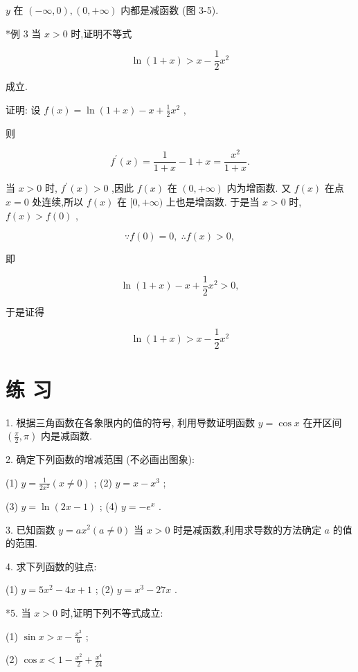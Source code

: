 \documentclass[lang=cn,newtx,10pt,scheme=chinese]{elegantbook}
\begin{document}
\(y\) 在 \(\left( {-\infty ,0}\right) ,\left( {0, + \infty }\right)\) 内都是减函数 (图 3-5).

*例 3 当 \(x > 0\) 时,证明不等式

\[
\ln \left( {1 + x}\right) > x - \frac{1}{2}{x}^{2}
\]

成立.

证明: 设 \(f\left( x\right) = \ln \left( {1 + x}\right) - x + \frac{1}{2}{x}^{2}\) ,

则

\[
{f}^{\prime }\left( x\right) = \frac{1}{1 + x} - 1 + x = \frac{{x}^{2}}{1 + x}.
\]

当 \(x > 0\) 时, \({f}^{\prime }\left( x\right) > 0\) ,因此 \(f\left( x\right)\) 在 \(\left( {0, + \infty }\right)\) 内为增函数. 又 \(f\left( x\right)\) 在点 \(x = 0\) 处连续,所以 \(f\left( x\right)\) 在 \(\lbrack 0, + \infty )\) 上也是增函数. 于是当 \(x > 0\) 时, \(f\left( x\right) > f\left( 0\right)\) ,

\[
\because f\left( 0\right) = 0,\;\therefore f\left( x\right) > 0,
\]

即

\[
\ln \left( {1 + x}\right) - x + \frac{1}{2}{x}^{2} > 0,
\]

于是证得

\[
\ln \left( {1 + x}\right) > x - \frac{1}{2}{x}^{2}
\]

\section{练 习}

1. 根据三角函数在各象限内的值的符号, 利用导数证明函数 \(y = \cos x\) 在开区间 \(\left( {\frac{\pi }{2},\pi }\right)\) 内是减函数.

2. 确定下列函数的增减范围 (不必画出图象):

(1) \(y = \frac{1}{2{x}^{2}}\left( {x \neq 0}\right)\) ; (2) \(y = x - {x}^{3}\) ;

(3) \(y = \ln \left( {{2x} - 1}\right)\) ; (4) \(y = - {e}^{x}\) .

3. 已知函数 \(y = a{x}^{2}\left( {a \neq 0}\right)\) 当 \(x > 0\) 时是减函数,利用求导数的方法确定 \(a\) 的值的范围.

4. 求下列函数的驻点:

(1) \(y = 5{x}^{2} - {4x} + 1\) ; (2) \(y = {x}^{3} - {27x}\) .

*5. 当 \(x > 0\) 时,证明下列不等式成立:

(1) \(\sin x > x - \frac{{x}^{3}}{6}\) ;

(2) \(\cos x < 1 - \frac{{x}^{2}}{2} + \frac{{x}^{4}}{24}\)
\end{document}
